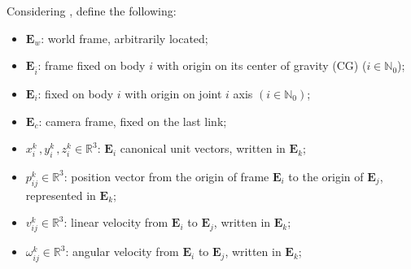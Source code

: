 Considering , define the following:%
%
\begin{itemize}
\item $\mathbf{E}_{w}$: world frame, arbitrarily located;
\item $\mathbf{E}_{\bar{i}}$: frame fixed on body $i$ with origin on its center of gravity (CG) ($i \in \mathbb{N}_0$);
\item $\mathbf{E}_{i}$: fixed on body $i$ with origin on joint $i$ axis $(i \in \mathbb{N}_0)$;
\item $\mathbf{E}_{c}$: camera frame, fixed on the last link;
%
\item $x^k_i\,,y^k_i\,,z^k_i \in \mathbb{R}^{3}$: $\mathbf{E}_i$ canonical unit vectors, written in $\mathbf{E}_k$;
%
%
\item $p^{k}_{ij} \in \mathbb{R}^{3}$: position vector from the origin of frame $\mathbf{E}_i$ to the origin of $\mathbf{E}_{j}$, represented in $\mathbf{E}_k$;
%
\item $v^{k}_{ij} \in \mathbb{R}^{3}$: linear velocity from $\mathbf{E}_i$ to  $\mathbf{E}_{j}$, written in $\mathbf{E}_k$;
%
\item $\omega^{k}_{ij} \in \mathbb{R}^{3}$: angular velocity from $\mathbf{E}_i$ to $\mathbf{E}_{j}$, written in $\mathbf{E}_k$;
%

\end{itemize}
